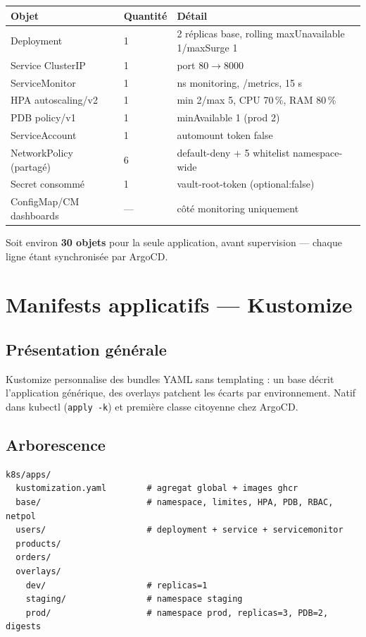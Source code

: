 \documentclass[12pt,a4paper]{article}
\begin{document}
\begin{longtable}{@{}p{4.2cm}p{2.2cm}p{7.6cm}@{}}
\toprule
\textbf{Objet} & \textbf{Quantité} & \textbf{Détail} \\
\midrule
\endhead
Deployment & 1 & 2 réplicas base, rolling maxUnavailable 1/maxSurge 1 \\
Service ClusterIP & 1 & port 80$\rightarrow$8000 \\
ServiceMonitor & 1 & ns monitoring, /metrics, 15 s \\
HPA autoscaling/v2 & 1 & min 2/max 5, CPU 70\,\%, RAM 80\,\% \\
PDB policy/v1 & 1 & minAvailable 1 (prod 2) \\
ServiceAccount & 1 & automount token false \\
NetworkPolicy (partagé) & 6 & default-deny + 5 whitelist namespace-wide \\
Secret consommé & 1 & vault-root-token (optional:false) \\
ConfigMap/CM dashboards & --- & côté monitoring uniquement \\
\bottomrule
\end{longtable}

Soit environ \textbf{30 objets} pour la seule application, avant supervision --- chaque ligne étant synchronisée par ArgoCD.

\section{Manifests applicatifs --- Kustomize}

\subsection{Présentation générale}
Kustomize personnalise des bundles YAML sans templating : un base décrit l'application générique, des overlays patchent les écarts par environnement. Natif dans kubectl (\texttt{apply -k}) et première classe citoyenne chez ArgoCD.

\subsection{Arborescence}
\begin{lstlisting}[caption={k8s/apps/ --- organisation}]
k8s/apps/
  kustomization.yaml        # agregat global + images ghcr
  base/                     # namespace, limites, HPA, PDB, RBAC, netpol
  users/                    # deployment + service + servicemonitor
  products/
  orders/
  overlays/
    dev/                    # replicas=1
    staging/                # namespace staging
    prod/                   # namespace prod, replicas=3, PDB=2, digests
\end{lstlisting}
\end{document}

